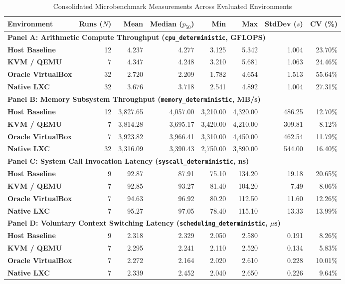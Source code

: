 \begin{table}[t]
\centering
\small
\caption{Consolidated Microbenchmark Measurements Across Evaluated Environments}
\label{tab:results_microbenchmarks}
\setlength{\tabcolsep}{3.5pt}
\begin{tabular*}{\textwidth}{@{\extracolsep{\fill}}lrrrrrrr}
\toprule
\textbf{Environment} & \textbf{Runs ($N$)} & \textbf{Mean} & \textbf{Median ($p_{50}$)} & \textbf{Min} & \textbf{Max} & \textbf{StdDev ($s$)} & \textbf{CV (\%)} \\
\midrule
\multicolumn{8}{l}{\textbf{Panel A: Arithmetic Compute Throughput (\texttt{cpu\_deterministic}, GFLOPS)}} \\
\midrule
\textbf{Host Baseline} & 12 & 4.237 & 4.277 & 3.125 & 5.342 & 1.004 & 23.70\% \\
\textbf{KVM / QEMU} & 7 & 4.347 & 4.248 & 3.210 & 5.681 & 1.063 & 24.46\% \\
\textbf{Oracle VirtualBox} & 32 & 2.720 & 2.209 & 1.782 & 4.654 & 1.513 & 55.64\% \\
\textbf{Native LXC} & 32 & 3.676 & 3.718 & 2.541 & 4.892 & 1.004 & 27.31\% \\
\midrule
\multicolumn{8}{l}{\textbf{Panel B: Memory Subsystem Throughput (\texttt{memory\_deterministic}, MB/s)}} \\
\midrule
\textbf{Host Baseline} & 12 & 3,827.65 & 4,057.00 & 3,210.00 & 4,320.00 & 486.25 & 12.70\% \\
\textbf{KVM / QEMU} & 7 & 3,814.28 & 3,695.17 & 3,420.00 & 4,210.00 & 309.81 & 8.12\% \\
\textbf{Oracle VirtualBox} & 7 & 3,923.82 & 3,966.41 & 3,310.00 & 4,450.00 & 462.54 & 11.79\% \\
\textbf{Native LXC} & 32 & 3,316.09 & 3,390.43 & 2,750.00 & 3,890.00 & 544.00 & 16.40\% \\
\midrule
\multicolumn{8}{l}{\textbf{Panel C: System Call Invocation Latency (\texttt{syscall\_deterministic}, ns)}} \\
\midrule
\textbf{Host Baseline} & 9 & 92.87 & 87.91 & 75.10 & 134.20 & 19.18 & 20.65\% \\
\textbf{KVM / QEMU} & 7 & 92.85 & 93.27 & 81.40 & 104.20 & 7.49 & 8.06\% \\
\textbf{Oracle VirtualBox} & 7 & 94.63 & 96.92 & 80.20 & 112.50 & 11.60 & 12.26\% \\
\textbf{Native LXC} & 7 & 95.27 & 97.05 & 78.40 & 115.10 & 13.33 & 13.99\% \\
\midrule
\multicolumn{8}{l}{\textbf{Panel D: Voluntary Context Switching Latency (\texttt{scheduling\_deterministic}, $\mu$s)}} \\
\midrule
\textbf{Host Baseline} & 9 & 2.318 & 2.329 & 2.050 & 2.580 & 0.191 & 8.26\% \\
\textbf{KVM / QEMU} & 7 & 2.295 & 2.241 & 2.110 & 2.520 & 0.134 & 5.83\% \\
\textbf{Oracle VirtualBox} & 7 & 2.272 & 2.164 & 2.020 & 2.610 & 0.228 & 10.01\% \\
\textbf{Native LXC} & 7 & 2.339 & 2.452 & 2.040 & 2.650 & 0.226 & 9.64\% \\
\bottomrule
\end{tabular*}
\end{table}

